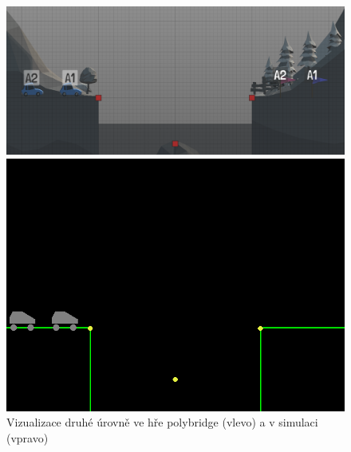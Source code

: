 \begin{figure}[ht]
    \centering
    \begin{minipage}{0.49\textwidth}
        \centering
        \includegraphics[width=\linewidth]{img/poly_lvl2.png}
    \end{minipage}\hfill
    \begin{minipage}{0.49\textwidth}
        \centering
        \includegraphics[width=\linewidth]{img/impl_lvl2.png}
    \end{minipage}
    \caption{Vizualizace druhé úrovně ve hře polybridge (vlevo) a v simulaci (vpravo)}
    \label{fig:3}
\end{figure}


